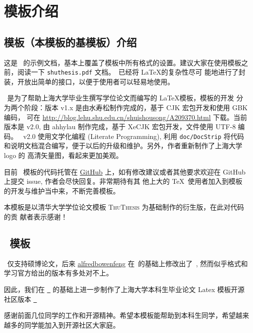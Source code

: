 \chapter{模板介绍}
\label{cha:intro}

\section{\shuthesis 模板（本模板的基模板）介绍}
这是 \shuthesis\ 的示例文档，基本上覆盖了模板中所有格式的设置。建议大家在使用模板之
前，阅读一下 \texttt{shuthesis.pdf} 文档。\shuthesis\ 已经将 \LaTeX 的复杂性尽可
能地进行了封装，开放出简单的接口，以便于使用者可以轻易地使用。

\shuthesis\ 是为了帮助上海大学毕业生撰写学位论文而编写的 \LaTeX 模板，模板的开发
分为两个阶段：版本 v1.x 是由水寿松制作完成的，基于 CJK 宏包开发和使用 GBK 编码，
可在 \url{http://blog.lehu.shu.edu.cn/shuishousong/A209370.html} 下载。当前
版本是 v2.0, 由 ahhylau 制作完成，基于 XeCJK 宏包开发，文件使用 UTF-8 编码。
\shuthesis\ v2.0 使用文学化编程 (Literate Programming), 利用 \texttt{doc/DocStrip} 
将代码和说明文档混合编写，便于以后的升级和维护。另外，作者重新制作了上海大学 logo 的
高清矢量图，看起来更加美观。

目前 \shuthesis\ 模板的代码托管在 \href{https://github.com/ahhylau/shuthesis}{GitHub} 
上，如有修改建议或者其他要求欢迎在 GitHub 上提交 issue, 作者会尽快回复。非常期待有其
他上大的 \TeX\ 使用者加入到模板的开发与维护当中来，不断完善模板。

本模板是以清华大学学位论文模板 \textsc{ThuThesis} 为基础制作的衍生版，在此对代码的贡
献者表示感谢！

\section{\shubachelorthesisOSC\ 模板}
\shuthesis\ 仅支持硕博论文，后来 \href{https://github.com/alfredbowenfeng}{alfredbowenfeng}
在\shuthesis\ 的基础上修改出了\shubachelorthesis\ , 然而似乎格式和学习官方给出的版本有多处对不上。

因此，我们在 \href{https://github.com/alfredbowenfeng/SHU-Bachelor-Thesis}{\shubachelorthesis\ } 
的基础上进一步制作了上海大学本科生毕业论文 Latex 模板开源社区版本
\href{https://github.com/EnJiang/SHU-Bachelor-Thesis-OSC}{\shubachelorthesisOSC\ }


感谢前面几位同学的工作和开源精神。希望本模板能帮助到本科生同学，希望越来越多的同学能加入到开源社区大家庭。

